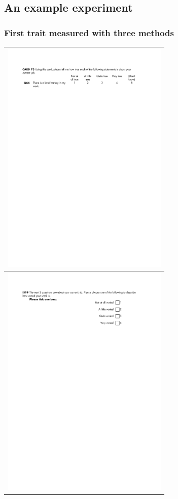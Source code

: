 \documentclass{beamer}
\begin{document}
\subsection{An example experiment}
\begin{frame}
	\frametitle{First trait measured with three methods}
	\begin{tabular}{l}
		\hline
		\includegraphics[width=8cm]{i/trait-1-m-1.pdf} \\\hline
		\includegraphics[width=8cm]{i/trait-1-m-2.pdf} \\\hline

\end{tabular}
\end{frame}
\end{document}

